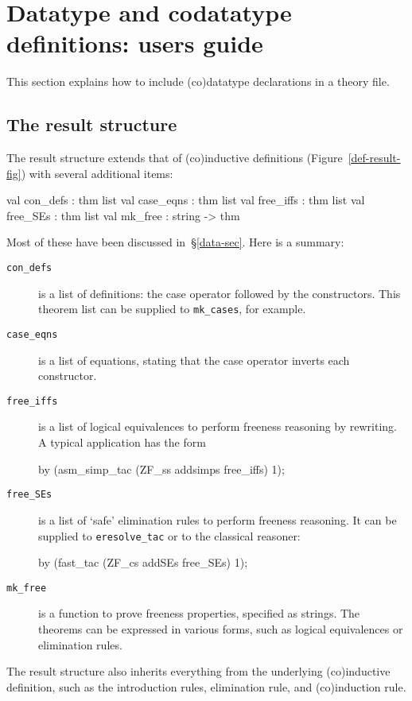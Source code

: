 \section{Datatype and codatatype definitions: users guide}
This section explains how to include (co)datatype declarations in a theory
file.  


\subsection{The result structure}
The result structure extends that of (co)inductive definitions
(Figure~\ref{def-result-fig}) with several additional items:
\begin{ttbox}
val con_defs  : thm list
val case_eqns : thm list
val free_iffs : thm list
val free_SEs  : thm list
val mk_free   : string -> thm
\end{ttbox}
Most of these have been discussed in~\S\ref{data-sec}.  Here is a summary:
\begin{description}
\item[\tt con\_defs] is a list of definitions: the case operator followed by
the constructors.  This theorem list can be supplied to \verb|mk_cases|, for
example.

\item[\tt case\_eqns] is a list of equations, stating that the case operator
inverts each constructor.

\item[\tt free\_iffs] is a list of logical equivalences to perform freeness
reasoning by rewriting.  A typical application has the form
\begin{ttbox}
by (asm_simp_tac (ZF_ss addsimps free_iffs) 1);
\end{ttbox}

\item[\tt free\_SEs] is a list of `safe' elimination rules to perform freeness
reasoning.  It can be supplied to \verb|eresolve_tac| or to the classical
reasoner:
\begin{ttbox} 
by (fast_tac (ZF_cs addSEs free_SEs) 1);
\end{ttbox}

\item[\tt mk\_free] is a function to prove freeness properties, specified as
strings.  The theorems can be expressed in various forms, such as logical
equivalences or elimination rules.
\end{description}

The result structure also inherits everything from the underlying
(co)inductive definition, such as the introduction rules, elimination rule,
and (co)induction rule.


